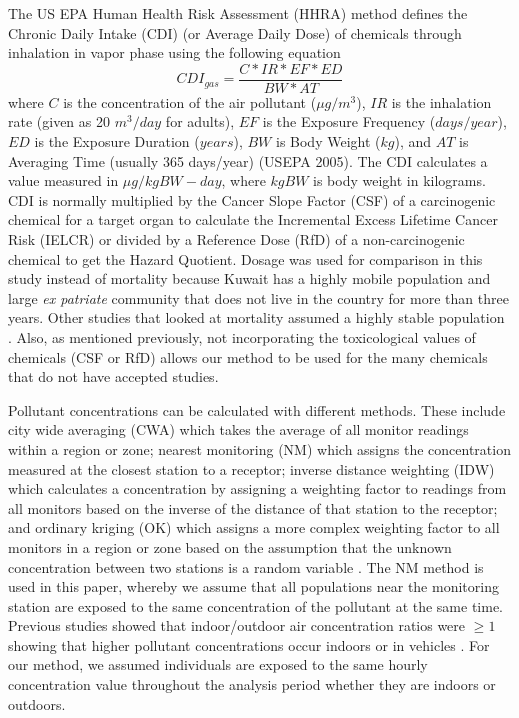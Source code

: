 The US EPA Human Health Risk Assessment (HHRA) method defines the Chronic Daily Intake (CDI) (or Average Daily Dose) of chemicals through inhalation in vapor phase using the following equation
%
\begin{equation}
\label{eq1:cdi_gas}
CDI_{gas} = \frac{C*IR*EF*ED}{BW*AT}
\end{equation}
%
\noindent
where $C$ is the concentration of the air pollutant ($\mu g/m^{3}$), $IR$ is the inhalation rate (given as 20 $m^{3}/day$ for adults), $EF$ is the Exposure Frequency ($days/year$), $ED$ is the Exposure Duration ($years$), $BW$ is Body Weight ($kg$), and $AT$ is Averaging Time (usually 365 days/year) (USEPA 2005).  The CDI calculates a value measured in $\mu g/kgBW-day$, where $kgBW$ is body weight in kilograms. CDI is normally multiplied by the Cancer Slope Factor (CSF) of a carcinogenic chemical for a target organ to calculate the Incremental Excess Lifetime Cancer Risk (IELCR) or divided by a Reference Dose (RfD) of a non-carcinogenic chemical to get the Hazard Quotient. Dosage was used for comparison in this study instead of mortality because Kuwait has a highly mobile population and large \textit{ex patriate} community that does not live in the country for more than three years. 
Other studies that looked at mortality assumed a highly stable population \citep{Sanhueza2010}. Also, as mentioned previously, not incorporating the toxicological values of chemicals (CSF or RfD) allows our method to be used for the many chemicals that do not have accepted studies.

Pollutant concentrations can be calculated with different methods. These include city wide averaging (CWA) which takes the average of all monitor readings within a region or zone; nearest monitoring (NM) which assigns the concentration measured at the closest station to a receptor; inverse distance weighting (IDW) which calculates a concentration by assigning a weighting factor to readings from all monitors based on the inverse of the distance of that station to the receptor; and ordinary kriging (OK) which assigns a more complex weighting factor to all monitors in a region or zone based on the assumption that the unknown concentration between two stations is a random variable \citep{Rivera2015}. The NM method is used in this paper, whereby we assume that all populations near the monitoring station are exposed to the same concentration of the pollutant at the same time. Previous studies showed that indoor/outdoor air concentration ratios were $\geq 1$ showing that higher pollutant concentrations occur indoors \citep{Schembari2013} or in vehicles \citep{Abi-Esber2013}. For our method, we assumed individuals are exposed to the same hourly concentration value throughout the analysis period whether they are indoors or outdoors.

